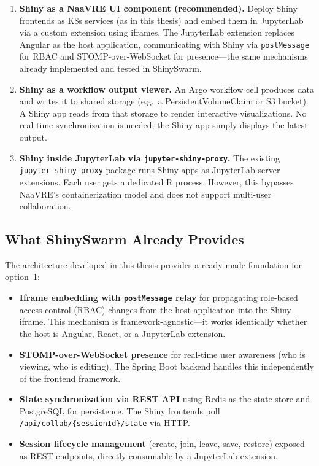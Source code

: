 \documentclass[11pt,a4paper]{article}
\begin{document}
\begin{enumerate}
  \item \textbf{Shiny as a NaaVRE UI component (recommended).}
        Deploy Shiny frontends as K8s services (as in this thesis) and
        embed them in JupyterLab via a custom extension using iframes.
        The JupyterLab extension replaces Angular as the host application,
        communicating with Shiny via \texttt{postMessage} for RBAC and
        STOMP-over-WebSocket for presence---the same mechanisms already
        implemented and tested in ShinySwarm.

  \item \textbf{Shiny as a workflow output viewer.}
        An Argo workflow cell produces data and writes it to shared
        storage (e.g.\ a PersistentVolumeClaim or S3 bucket). A Shiny
        app reads from that storage to render interactive visualizations.
        No real-time synchronization is needed; the Shiny app simply
        displays the latest output.

  \item \textbf{Shiny inside JupyterLab via \texttt{jupyter-shiny-proxy}.}
        The existing \texttt{jupyter-shiny-proxy} package runs Shiny
        apps as JupyterLab server extensions. Each user gets a dedicated
        R process. However, this bypasses NaaVRE's containerization model
        and does not support multi-user collaboration.
\end{enumerate}

\subsection{What ShinySwarm Already Provides}

The architecture developed in this thesis provides a ready-made
foundation for option~1:

\begin{itemize}
  \item \textbf{Iframe embedding with \texttt{postMessage} relay} for
        propagating role-based access control (RBAC) changes from the
        host application into the Shiny iframe. This mechanism is
        framework-agnostic---it works identically whether the host is
        Angular, React, or a JupyterLab extension.
  \item \textbf{STOMP-over-WebSocket presence} for real-time user
        awareness (who is viewing, who is editing). The Spring Boot
        backend handles this independently of the frontend framework.
  \item \textbf{State synchronization via REST API} using Redis as the
        state store and PostgreSQL for persistence. The Shiny frontends
        poll \texttt{/api/collab/\{sessionId\}/state} via HTTP.
  \item \textbf{Session lifecycle management} (create, join, leave, save,
        restore) exposed as REST endpoints, directly consumable by a
        JupyterLab extension.
\end{itemize}
\end{document}
